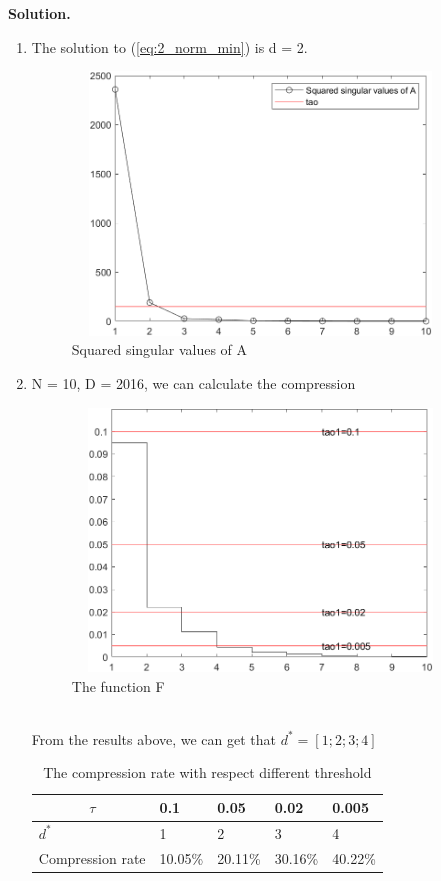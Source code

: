 \documentclass[english,onecolumn]{IEEEtran}
\begin{document}
\noindent
\textbf{Solution.}
\begin{enumerate}
	\item The solution to (\ref{eq:2_norm_min}) is d = 2.
	\begin{figure}[h]
		\centering
		\includegraphics[height=7cm,width=10cm]{pro5_1.png}
		\caption{Squared singular values of A}
		\label{5}
	\end{figure}
	
	\newpage
	\item N = 10, D = 2016, we can calculate the compression
	\begin{figure}[h]
		\centering
		\includegraphics[height=7cm,width=10cm]{pro5_2.png}
		\caption{The function F}
		\label{5}
	\end{figure}\\
From the results above, we can get that $d^* = \left[1; 2; 3; 4\right]$
	\begin{table}[htb]
		\centering
		\begin{tabular}{|l|l|l|l|l|}
			\hline
			\multicolumn{1}{|c|}{$\tau$} & 0.1 & 0.05 & 0.02 & 0.005 \\ \hline
			$d^*$ & 1 & 2 & 3 & 4 \\ \hline
			Compression rate   & 10.05\%  &  20.11\%  & 30.16\%  & 40.22\% \\ \hline
		\end{tabular}
		\caption{The compression rate with respect different threshold}
	\end{table}


\end{enumerate}
\end{document}
